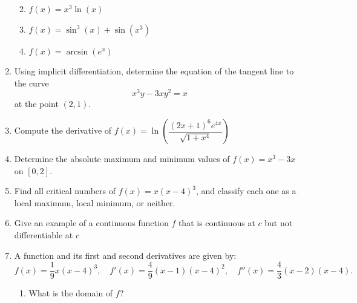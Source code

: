 \documentclass[12pt]{article}
\newcommand{\points}[1]{\marginpar{\hspace{24pt}[#1]}}
\begin{document}
\begin{enumerate}
\begin{enumerate}
 \vspace{1.5in}
 
 \item $f(x) = x^3\ln(x)$ \points{2}
 
 \vspace{1.25in}
 
 \item $f(x) = \sin^3(x)+\sin(x^3)$ \points{2}
 
 \vspace{1.5in}
 
 \item $f(x) = \arcsin(e^x)$ \points{2}
 \end{enumerate}
 \newpage
 
 \item Using implicit differentiation, determine the equation of the tangent line to the curve \points{6}
 \[
 x^3y-3xy^2=x
 \]
 at the point $(2,1)$.
 
 \vspace{3.75in}
 
 \item Compute the derivative of \points{4}
 $f(x) = \ln\left(\dfrac{(2x+1)^6e^{4x}}{\sqrt{1+x^4}}\right)$ 
 
 

 \newpage
 
 \item Determine the absolute maximum and minimum values of $f(x) = x^3-3x$ on $[0,2]$. \points{4}
 
 \vspace{3.25in}
 
 \item Find all critical numbers of $f(x) = x(x-4)^{3}$, and classify each one as a local maximum, local minimum, or neither. \points{4}
 
 \vspace{3.25in}
 
 \item Give an example of a continuous function $f$ that is continuous at $c$ but not differentiable at $c$ \points{2} 
 
 \newpage
 
 \item A function and its first and second derivatives are given by:
 \[
 f(x)=\frac{1}{9}x(x-4)^3,\quad f'(x) = \frac{4}{9}(x-1)(x-4)^2, \quad f''(x) = \frac{4}{3}(x-2)(x-4).
 \]
  
   
  \begin{enumerate}
  \item What is the domain of $f$? \points{1}
  

\end{enumerate}
\end{enumerate}
\end{document}
